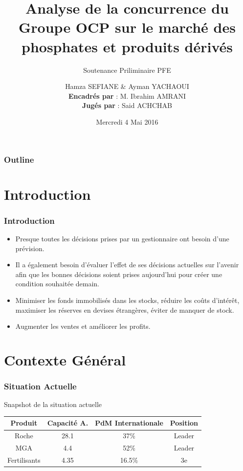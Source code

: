 \documentclass{beamer}
\title[ENSIAS - Business Intelligence]{
  Analyse de la concurrence du Groupe OCP sur le marché des phosphates et produits dérivés}
\subtitle{\tiny{Soutenance Priliminaire PFE}}
\author[SEFIANE \& YACHAOUI]{
  Hamza SEFIANE \& Ayman YACHAOUI \\\medskip
  {\small \textbf{Encadrés par} : M. Ibrahim AMRANI} \\ 
  {\small \textbf{Jugés par} : Said ACHCHAB}}
\institute[]{
  École Nationale Supérieure d'Informatique et d'Analyse des Systèmes}
\date[Année universitaire 2015-2016]{
  Mercredi 4 Mai 2016}
\begin{document}
\begin{frame}
  \titlepage
\end{frame}

\begin{frame}
  \frametitle{Outline}

  \tableofcontents
\end{frame}

\section{Introduction}

\begin{frame}
  \frametitle{Introduction}

  \begin{itemize}
    \item Presque toutes les décisions prises par un gestionnaire ont besoin d'une prévision.
    \item Il a également besoin d'évaluer l'effet de ses décisions actuelles sur l'avenir afin que les bonnes décisions soient prises aujourd'hui pour créer une condition souhaitée demain.
    \item Minimiser les fonds immobilisés dans les stocks, réduire les coûts d'intérêt, maximiser les réserves en devises étrangères, éviter de manquer de stock.
    \item Augmenter les ventes et améliorer les profits.
  \end{itemize}
\end{frame}

\section{Contexte Général}
\begin{frame}
\frametitle{Situation Actuelle}
\begin{block}{Snapshot de la situation actuelle}
\begin{table}
\centering 
  \begin{tabular}{|c|c|c|c|}
  \hline
  \small{Produit} & \small{Capacité A.} & \small{PdM Internationale} & \small{Position} \\
  \hline
  Roche & 28.1 & 37\% & Leader\\
  MGA & 4.4 & 52\% & Leader\\
  Fertilisants & 4.35 & 16.5\% & 3e\\
  \hline
  \end{tabular}
  \end{table}
  \end{block} 
\end{frame}
\end{document}
